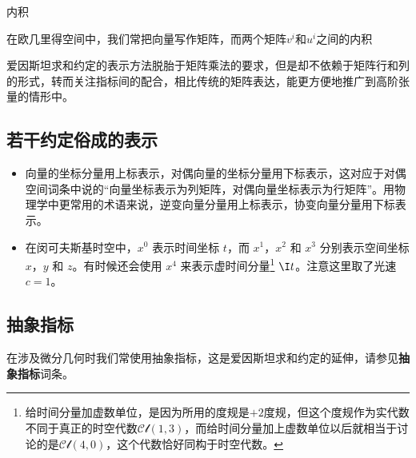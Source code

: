 \begin{example}{内积}

在欧几里得空间中，我们常把向量写作矩阵，而两个矩阵$v^i$和$u^i$之间的内积

\end{example}



爱因斯坦求和约定的表示方法脱胎于矩阵乘法的要求，但是却不依赖于矩阵行和列的形式，转而关注指标间的配合，相比传统的矩阵表达，能更方便地推广到高阶张量的情形中。


\subsection{若干约定俗成的表示}
\begin{itemize}
\item 向量的坐标分量用上标表示，对偶向量的坐标分量用下标表示，这对应于对偶空间词条中说的“向量坐标表示为列矩阵，对偶向量坐标表示为行矩阵”。用物理学中更常用的术语来说，逆变向量分量用上标表示，协变向量分量用下标表示。

\item 在闵可夫斯基时空中，$x^0$ 表示时间坐标 $t$，而 $x^1$，$x^2$ 和 $x^3$ 分别表示空间坐标 $x$，$y$ 和 $z$。有时候还会使用 $x^4$ 来表示虚时间分量\footnote{给时间分量加虚数单位，是因为所用的度规是$+2$度规，但这个度规作为实代数不同于真正的时空代数$\mathcal{Cl}(1, 3)$，而给时间分量加上虚数单位以后就相当于讨论的是$\mathcal{Cl}(4, 0)$，这个代数恰好同构于时空代数。} $\I t$。注意这里取了光速 $c=1$。




\end{itemize}







\subsection{抽象指标}

在涉及微分几何时我们常使用抽象指标，这是爱因斯坦求和约定的延伸，请参见\textbf{抽象指标}词条。




